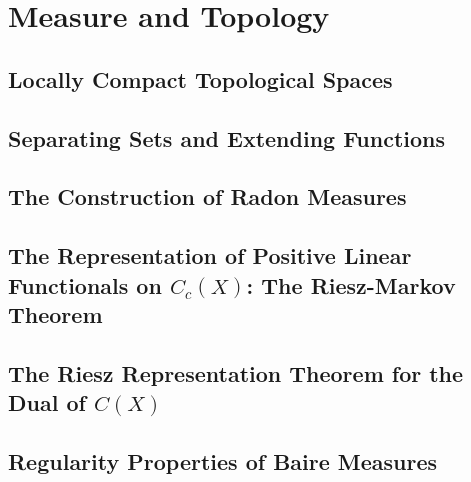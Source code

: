 \chapter{Measure and Topology}

\section{Locally Compact Topological Spaces}
\section{Separating Sets and Extending Functions}
\section{The Construction of Radon Measures}
\section{The Representation of Positive Linear Functionals on $C_c(X)$: The Riesz-Markov Theorem}
\section{The Riesz Representation Theorem for the Dual of $C(X)$}
\section{Regularity Properties of Baire Measures}
